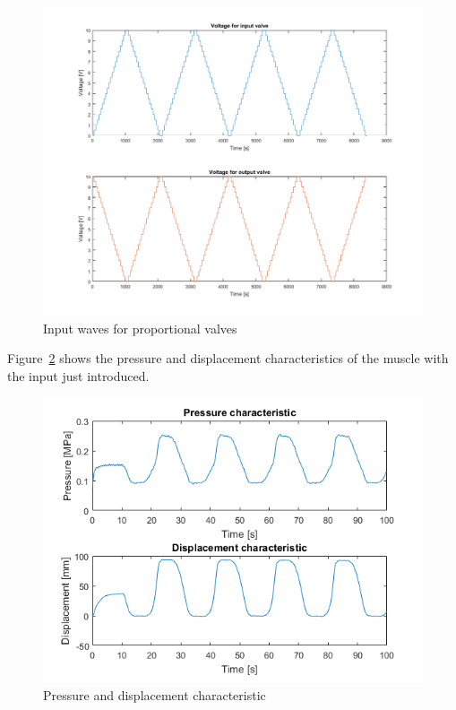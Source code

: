 \begin{figure}[h]
	\centering
	\includegraphics[width=\linewidth]{"Images/stair_input_waves"}
	\caption[Input waves for proportional valves]{Input waves for proportional valves}
	\label{fig:input_voltage}
\end{figure}

Figure~\ref{fig:disp_press} shows the pressure and displacement characteristics
of the muscle with the input just introduced.

\begin{figure}[H]
	\centering
	\includegraphics[width=\linewidth]{"Images/pressure_displacement"}
	\caption[Pressure and displacement characteristic]{Pressure and displacement characteristic}
	\label{fig:disp_press}
\end{figure}

